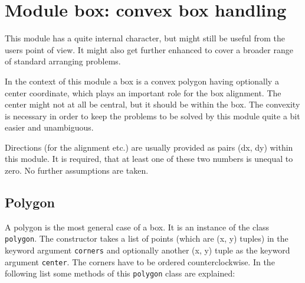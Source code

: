\chapter{Module box: convex box handling}
\label{module:box}

This module has a quite internal character, but might still be useful
from the users point of view. It might also get further enhanced to
cover a broader range of standard arranging problems.

In the context of this module a box is a convex polygon having
optionally a center coordinate, which plays an important role for the
box alignment. The center might not at all be central, but it should
be within the box. The convexity is necessary in order to keep the
problems to be solved by this module quite a bit easier and
unambiguous.

Directions (for the alignment etc.) are usually provided as pairs
(dx, dy) within this module. It is required, that at least one of
these two numbers is unequal to zero. No further assumptions are taken.

\section{Polygon}

A polygon is the most general case of a box. It is an instance of the
class \verb|polygon|. The constructor takes a list of points (which
are (x, y) tuples) in the keyword argument \verb|corners| and
optionally another (x, y) tuple as the keyword argument \verb|center|.
The corners have to be ordered counterclockwise. In the following list
some methods of this \verb|polygon| class are explained:

